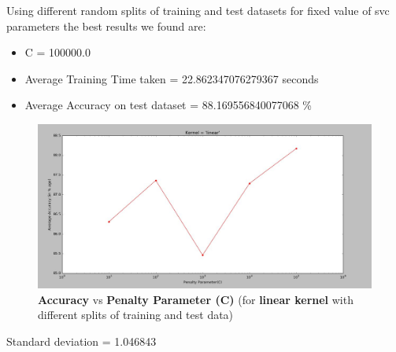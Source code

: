\documentclass{beamer}
\begin{document}
\begin{frame}[t, allowframebreaks]
\begin{vwcol}[widths={6.5,3.0}, sep=.8cm, justify=flush, rule=0pt, indent=1em]
\begin{minipage}{0.3\linewidth}
Using different random splits
of training and test datasets
for fixed value of svc
parameters the best results
we found are:
\begin{itemize}
\item C = 100000.0
\item Average Training Time
taken =
22.862347076279367
seconds
\item Average Accuracy on test
dataset =
88.169556840077068 \%
\end{itemize}

\end{minipage}
\end{vwcol}


\begin{figure}[!h]
  \includegraphics[width=0.8\linewidth]{linear_for_different_randomstates.JPG}
  \caption*{\tiny \textbf{Accuracy }vs\textbf{ Penalty Parameter (C)} (for \textbf{linear kernel} with different splits of training and test data)}
  \label{fig:}
\end{figure}
\begin{block}
\LARGE Standard deviation = 1.046843
\end{block}



\end{frame}
\end{document}
